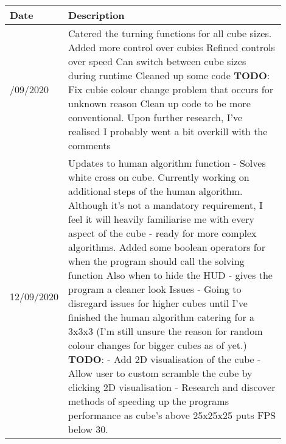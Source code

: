 \documentclass[12pt]{report} %
\begin{document}
\begin{table}[!ht]
    \centering
    \begin{tabular}{
        |>{\centering\arraybackslash}p{0.1\linewidth}
        |p{0.8\linewidth}|}
    \hline
    \textbf{Date} & \textbf{Description} \\ \hline
    09/09/2020  &
    Catered the turning functions for all cube sizes. \newline
    Added more control over cubies  \newline
    Refined controls over speed \newline
    Can switch between cube sizes during runtime    \newline
    Cleaned up some code    \newline
    \textbf{TODO}:
    Fix cubie colour change problem that occurs for unknown reason  \newline
    Clean up code to be more conventional. Upon further research, I've realised I probably went a bit overkill with the comments
    \\ \hline
    12/09/2020  &
    Updates to human algorithm function - Solves white cross on cube.   \newline
    Currently working on additional steps of the human algorithm.
    \newline
    Although it's not a mandatory requirement, I feel it will heavily familiarise me with every aspect of the cube - ready for more complex algorithms.
    \newline
    Added some boolean operators for when the program should call the solving function
    \newline
    Also when to hide the HUD - gives the program a cleaner look
    \newline
    Issues\newline
    - Going to disregard issues for higher cubes until I've finished the human algorithm catering for a 3x3x3
    (I'm still unsure the reason for random colour changes for bigger cubes as of yet.)\newline
    \textbf{TODO}:\newline
    - Add 2D visualisation of the cube\newline
        - Allow user to custom scramble the cube by clicking 2D visualisation\newline
    - Research and discover methods of speeding up the programs performance as cube's above 25x25x25 puts FPS below 30.\newline

\end{tabular}
\end{table}
\end{document}
